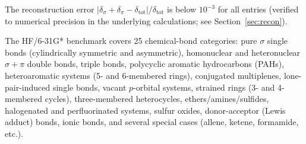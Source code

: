 \documentclass[11pt,a4paper]{article}
\begin{document}
The reconstruction error
$|\delta_\sigma + \delta_\pi - \delta_{\text{tot}}|/\delta_{\text{tot}}$
is below $10^{-3}$ for all entries (verified to numerical precision in the
underlying calculations; see Section~\ref{sec:recon}).

The HF/6-31G* benchmark covers 25 chemical-bond categories: pure $\sigma$
single bonds (cylindrically symmetric and asymmetric), homonuclear and
heteronuclear $\sigma + \pi$ double bonds, triple bonds, polycyclic
aromatic hydrocarbons (PAHs), heteroaromatic systems (5- and 6-membered
rings), conjugated multiplenes, lone-pair-induced single bonds, vacant
$p$-orbital systems, strained rings (3- and 4-membered cycles), three-membered
heterocycles, ethers/amines/sulfides, halogenated and perfluorinated
systems, sulfur oxides, donor-acceptor (Lewis adduct) bonds, ionic bonds,
and several special cases (allene, ketene, formamide, etc.).
\end{document}
